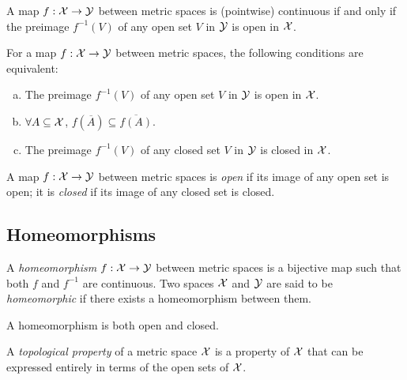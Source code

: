 \begin{thm}
  \label{thm:contMapOpenPreimage}
  A map $f:{\cal X}\rightarrow {\cal Y}$ between metric spaces
  is (pointwise) continuous if and only if
  the preimage $f^{-1}(V)$ of any open set $V$ in ${\cal Y}$
  is open in ${\cal X}$.
\end{thm}

\begin{thm}
  \label{thm:contMapConditions}
  For a map $f:{\cal X}\rightarrow {\cal Y}$ between metric spaces,
  the following conditions are equivalent:
  \begin{enumerate}[(a)]
  \item The preimage $f^{-1}(V)$ of any open set $V$ in ${\cal Y}$
    is open in ${\cal X}$.
  \item $\forall A\subseteq {\cal X}$,
    $f(\overline{A})\subseteq \overline{f(A)}$.
  \item The preimage $f^{-1}(V)$ of any closed set $V$ in ${\cal Y}$
    is closed in ${\cal X}$.
  \end{enumerate}
\end{thm}

\begin{defn}
  \label{def:openMap}
  A map $f:{\cal X}\rightarrow {\cal Y}$ between metric spaces is \emph{open}
  if its image of any open set is open; 
  it is \emph{closed} if its image of any closed set is closed. 
\end{defn}




\subsection{Homeomorphisms}
\label{sec:homeomorphisms}

\begin{defn}
  A \emph{homeomorphism} $f:{\cal X}\rightarrow {\cal Y}$
  between metric spaces
  is a bijective map such that both $f$ and $f^{-1}$
  are continuous.
  Two spaces ${\cal X}$ and ${\cal Y}$
  are said to be \emph{homeomorphic}
  if there exists a homeomorphism between them.
\end{defn}


\begin{lem}
  \label{lem:homeomorphismIsOpenAndClosed}
  A homeomorphism is both open and closed.
\end{lem}

\begin{defn}
  \label{def:topologicalProperty}
  A \emph{topological property} of a metric space ${\cal X}$
  is a property of ${\cal X}$
  that can be expressed entirely in terms of
  the open sets of ${\cal X}$.
\end{defn}

